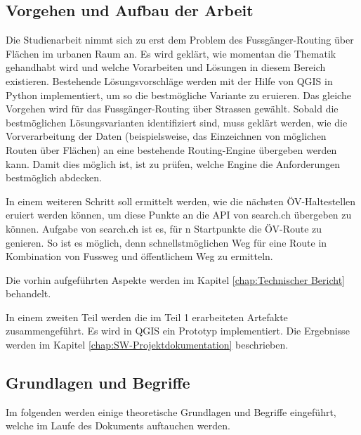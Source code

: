 
\subsection{Vorgehen und Aufbau der Arbeit}
\label{Vorgehen und Aufbau der Arbeit}
Die Studienarbeit nimmt sich zu erst dem Problem des Fussgänger-Routing über Flächen im urbanen Raum an. Es wird geklärt, wie momentan die Thematik gehandhabt wird und welche Vorarbeiten und Lösungen in diesem Bereich existieren. Bestehende Lösungsvorschläge werden mit der Hilfe von QGIS in Python implementiert, um so die bestmögliche Variante zu eruieren. Das gleiche Vorgehen wird für das Fussgänger-Routing über Strassen gewählt. Sobald die bestmöglichen Lösungsvarianten identifiziert sind, muss geklärt werden, wie die Vorverarbeitung der Daten (beispielsweise, das Einzeichnen von möglichen Routen über Flächen) an eine bestehende Routing-Engine übergeben werden kann. Damit dies möglich ist, ist zu prüfen, welche Engine die Anforderungen bestmöglich abdecken.

In einem weiteren Schritt soll ermittelt werden, wie die nächsten ÖV-Haltestellen eruiert werden können, um diese Punkte an die API von search.ch übergeben zu können. Aufgabe von search.ch ist es, für n Startpunkte die ÖV-Route zu genieren. So ist es möglich, denn schnellstmöglichen Weg für eine Route in Kombination von Fussweg und öffentlichem Weg zu ermitteln.

Die vorhin aufgeführten Aspekte werden im Kapitel \ref{chap:Technischer Bericht} behandelt.

In einem zweiten Teil werden die im Teil 1 erarbeiteten Artefakte zusammengeführt. Es wird in QGIS ein Prototyp implementiert. Die Ergebnisse werden im Kapitel \ref{chap:SW-Projektdokumentation} beschrieben.




\subsection{Grundlagen und Begriffe}
\label{Grundlagen und Begriffe}

Im folgenden werden einige theoretische Grundlagen und Begriffe eingeführt, welche im Laufe des Dokuments auftauchen werden.



